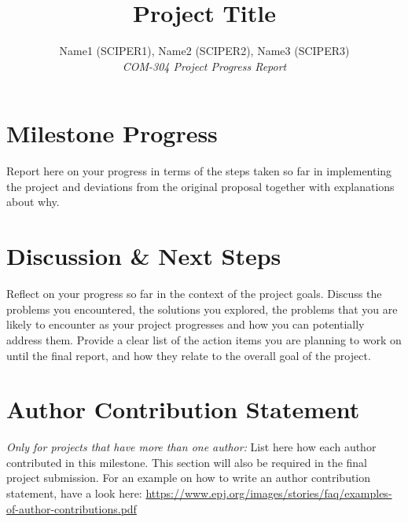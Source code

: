 \documentclass[10pt,conference,compsocconf]{IEEEtran}
\begin{document}
\title{Project Title}

\author{
  Name1 (SCIPER1), Name2 (SCIPER2), Name3 (SCIPER3)\\
  \textit{COM-304 Project Progress Report}
}

\maketitle


\section{Milestone Progress}
Report here on your progress in terms of the steps taken so far in implementing the project and deviations from the original proposal together with explanations about why.

\section{Discussion \& Next Steps}
Reflect on your progress so far in the context of the project goals. Discuss the problems you encountered, the solutions you explored, the problems that you are likely to encounter as your project progresses and how you can potentially address them. Provide a clear list of the action items you are planning to work on until the final report, and how they relate to the overall goal of the project.


\section{Author Contribution Statement}
\textit{Only for projects that have more than one author:}
List here how each author contributed in this milestone. This section will also be required in the final project submission. For an example on how to write an author contribution statement, have a look here: \url{https://www.epj.org/images/stories/faq/examples-of-author-contributions.pdf}


%
%
\end{document}
